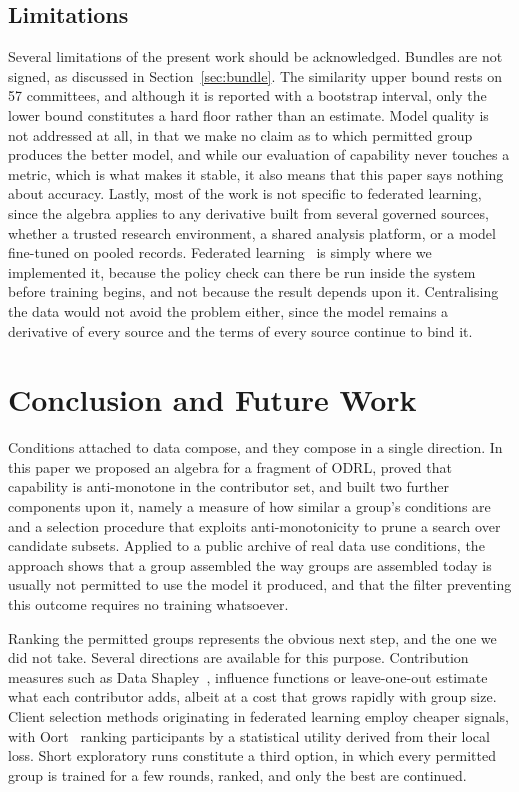 \documentclass[sigconf,anonymous,review]{acmart}
\begin{document}
\subsection{Limitations}

Several limitations of the present work should be acknowledged. Bundles are not
signed, as discussed in Section~\ref{sec:bundle}. The similarity upper bound
rests on 57 committees, and although it is reported with a bootstrap interval,
only the lower bound constitutes a hard floor rather than an estimate. Model
quality is not addressed at all, in that we make no claim as to which permitted
group produces the better model, and while our evaluation of capability never
touches a metric, which is what makes it stable, it also means that this paper
says nothing about accuracy. Lastly, most of the work is not specific to
federated learning, since the algebra applies to any derivative built from
several governed sources, whether a trusted research environment, a shared
analysis platform, or a model fine-tuned on pooled records. Federated
learning~\cite{fedavg} is simply where we implemented it, because the policy
check can there be run inside the system before training begins, and not because
the result depends upon it. Centralising the data would not avoid the problem
either, since the model remains a derivative of every source and the terms of
every source continue to bind it.

\section{Conclusion and Future Work}
\label{sec:conclusion}

Conditions attached to data compose, and they compose in a single direction. In
this paper we proposed an algebra for a fragment of ODRL, proved that capability
is anti-monotone in the contributor set, and built two further components upon
it, namely a measure of how similar a group's conditions are and a selection
procedure that exploits anti-monotonicity to prune a search over candidate
subsets. Applied to a public archive of real data use conditions, the approach
shows that a group assembled the way groups are assembled today is usually not
permitted to use the model it produced, and that the filter preventing this
outcome requires no training whatsoever.

Ranking the permitted groups represents the obvious next step, and the one we did
not take. Several directions are available for this purpose. Contribution
measures such as Data Shapley~\cite{datashapley}, influence functions or
leave-one-out estimate what each contributor adds, albeit at a cost that grows
rapidly with group size. Client selection methods originating in federated
learning employ cheaper signals, with Oort~\cite{oort} ranking participants by a
statistical utility derived from their local loss. Short exploratory runs
constitute a third option, in which every permitted group is trained for a few
rounds, ranked, and only the best are continued.
\end{document}
